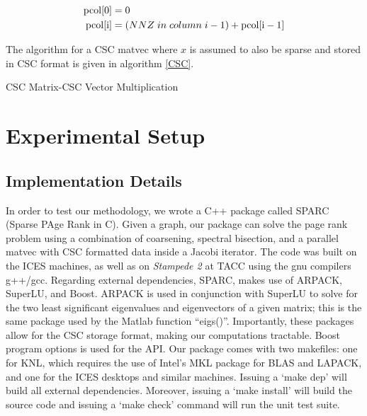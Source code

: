 \documentclass[11pt]{article}
\begin{document}
\begin{equation*}
	\begin{split}
		\rm{pcol}[0] &= 0\\
		\rm{pcol}[i] &=
		(NNZ\;in\;column\;i-1)
		+ \rm{pcol}[i-1]
	\end{split}
\end{equation*}

The algorithm for a CSC matvec where $x$ is assumed to also be
sparse and stored in CSC format is given in algorithm \ref{CSC}.

\begin{algorithm}[H]
\caption{CSC Matrix-CSC Vector Multiplication}\label{CSC}
\begin{algorithmic}[1]
\EndFor
\EndParFor
{}
\EndProcedure
\end{algorithmic}
\end{algorithm}

\section{Experimental Setup}
\subsection{Implementation Details}

In order to test our methodology, we wrote a C++
package called {\rm SPARC} (Sparse PAge Rank in C). Given a
graph, our package can solve the page rank problem using a combination of coarsening, spectral
bisection, and a parallel matvec with CSC formatted data inside a Jacobi
iterator. The code was built on the ICES machines, as well as on \textit{Stampede 2} at TACC using the gnu
compilers g++/gcc. Regarding external dependencies, {\rm SPARC}, makes use of
{\rm ARPACK}, {\rm SuperLU}, and {\rm Boost}. {\rm ARPACK} is used in conjunction
with {\rm SuperLU} to solve for the two least significant eigenvalues and
eigenvectors of a given
matrix; this is the same package used by the Matlab function ``eigs()''.
Importantly, these packages allow for the CSC storage format, making our
computations tractable. {\rm
Boost} program options is used for the API. Our package comes with two
makefiles: one for KNL, which requires the use of Intel's MKL package for BLAS
and LAPACK, and one for the ICES desktops and similar machines. Issuing a `make
dep' will build all external dependencies. Moreover, issuing a `make install' will
build the source code and issuing a `make check' command will run the unit test suite.  
\end{document}
